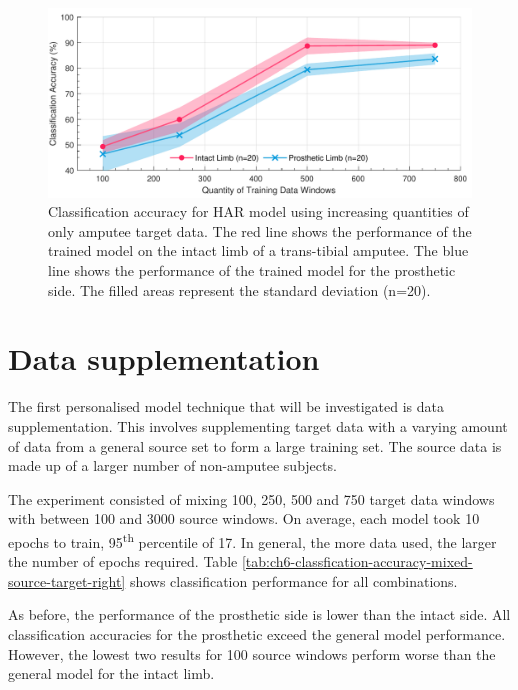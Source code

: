 \begin{figure}[H]
    \centering
    \includegraphics[width=\textwidth]{content/6-Amputee/ch6_baseline_model_accuracy.pdf}
    \caption[Classification accuracy using increasing quantities of amputee target data]{Classification accuracy for HAR model using increasing quantities of only amputee target data. The red line shows the performance of the trained model on the intact limb of a trans-tibial amputee. The blue line shows the performance of the trained model for the prosthetic side. The filled areas represent the standard deviation (n=20).}
    \label{fig:ch6-amputee-baseline-bespoke-model}
\end{figure}


\section{Data supplementation} %
\label{sec:amputee-supplementation}
The first personalised model technique that will be investigated is data supplementation. This involves supplementing target data with a varying amount of data from a general source set to form a large training set. The source data is made up of a larger number of non-amputee subjects.

The experiment consisted of mixing 100, 250, 500 and 750 target data windows with between 100 and 3000 source windows. On average, each model took 10 epochs to train, 95\textsuperscript{th} percentile of 17. In general, the more data used, the larger the number of epochs required. Table \ref{tab:ch6-classfication-accuracy-mixed-source-target-right} shows classification performance for all combinations.

As before, the performance of the prosthetic side is lower than the intact side. All classification accuracies for the prosthetic exceed the general model performance. However, the lowest two results for 100 source windows perform worse than the general model for the intact limb.

